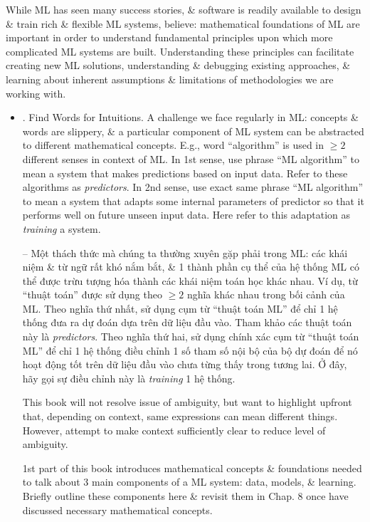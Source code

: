 \documentclass{article}
\begin{document}
\begin{enumerate}
\begin{itemize}
		While ML has seen many success stories, \& software is readily available to design \& train rich \& flexible ML systems, believe: mathematical foundations of ML are important in order to understand fundamental principles upon which more complicated ML systems are built. Understanding these principles can facilitate creating new ML solutions, understanding \& debugging existing approaches, \& learning about inherent assumptions \& limitations of methodologies we are working with.
		\begin{itemize}
			\item {. Find Words for Intuitions.} A challenge we face regularly in ML: concepts \& words are slippery, \& a particular component of ML system can be abstracted to different mathematical concepts. E.g., word ``algorithm'' is used in $\ge2$ different senses in context of ML. In 1st sense, use phrase ``ML algorithm'' to mean a system that makes predictions based on input data. Refer to these algorithms as {\it predictors}. In 2nd sense, use exact same phrase ``ML algorithm'' to mean a system that adapts some internal parameters of predictor so that it performs well on future unseen input data. Here refer to this adaptation as {\it training} a system.
			
			-- Một thách thức mà chúng ta thường xuyên gặp phải trong ML: các khái niệm \& từ ngữ rất khó nắm bắt, \& 1 thành phần cụ thể của hệ thống ML có thể được trừu tượng hóa thành các khái niệm toán học khác nhau. Ví dụ, từ ``thuật toán'' được sử dụng theo $\ge2$ nghĩa khác nhau trong bối cảnh của ML. Theo nghĩa thứ nhất, sử dụng cụm từ ``thuật toán ML'' để chỉ 1 hệ thống đưa ra dự đoán dựa trên dữ liệu đầu vào. Tham khảo các thuật toán này là {\it predictors}. Theo nghĩa thứ hai, sử dụng chính xác cụm từ ``thuật toán ML'' để chỉ 1 hệ thống điều chỉnh 1 số tham số nội bộ của bộ dự đoán để nó hoạt động tốt trên dữ liệu đầu vào chưa từng thấy trong tương lai. Ở đây, hãy gọi sự điều chỉnh này là {\it training} 1 hệ thống.
			
			This book will not resolve issue of ambiguity, but want to highlight upfront that, depending on context, same expressions can mean different things. However, attempt to make context sufficiently clear to reduce level of ambiguity.
			
			1st part of this book introduces mathematical concepts \& foundations needed to talk about 3 main components of a ML system: data, models, \& learning. Briefly outline these components here \& revisit them in Chap. 8 once have discussed necessary mathematical concepts.
			

\end{itemize}
\end{itemize}
\end{enumerate}
\end{document}
